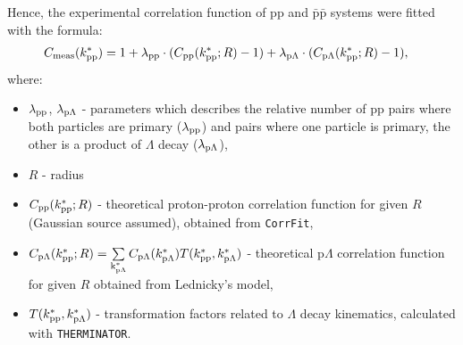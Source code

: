 Hence, the experimental correlation function of pp and $\bar{\mathrm{p}}\bar{\mathrm{p}}$ systems were fitted with the formula:
\begin{align}
  C_{\rm meas} (k^*_{\rm pp}) &= 1 + \lambda_{\rm pp} \cdot (C_{\rm pp} (k^*_{\rm pp};R) - 1) + \lambda_{\rm p\Lambda} \cdot(C_{\rm p\Lambda} (k^*_{\rm pp};R) - 1),
  \label{fitformula}
\end{align}
where:
\begin{itemize}
\item $\lambda_{\rm pp}$, $\lambda_{\rm p\Lambda}$ - parameters which describes the relative number of pp pairs where both particles are primary ($\lambda_{\rm pp}$) and pairs where one particle is primary, the other is a product of $\Lambda$ decay ($\lambda_{\rm p\Lambda}$),
\item $R$ - radius
\item $C_{\rm pp} (k^*_{\rm pp};R)$ - theoretical proton-proton correlation function for given $R$ (Gaussian source assumed), obtained from \verb|CorrFit|,
\item $C_{\rm p\Lambda} (k^*_{\rm pp};R) = \sum\limits_{\rm k^*_{\rm p\Lambda}} {C_{\rm p\Lambda} (k^*_{\rm p\Lambda}) T(k^*_{\rm pp},k^*_{\rm p\Lambda})}$ - theoretical p$\Lambda$ correlation function for given $R$ obtained from Lednicky's model,
\item $T(k^*_{\rm pp},k^*_{\rm p\Lambda})$ - transformation factors related to $\Lambda$ decay kinematics, calculated with \verb|THERMINATOR|.
\end{itemize}

